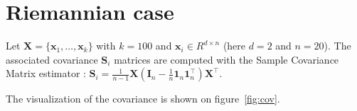 \section{Riemannian case}

Let $\boldsymbol{X} = \{\boldsymbol{x}_1, \ldots, \boldsymbol{x}_k\}$ with $k=100$ and $\boldsymbol{x}_i \in R^{d\times n}$ (here $d=2$ and $n=20$). The associated covariance $\boldsymbol{S}_i$ matrices are computed with the Sample Covariance Matrix estimator : $\boldsymbol{S}_i = \frac{1}{n-1} \boldsymbol{X}(\boldsymbol{I}_n - \frac{1}{n}\boldsymbol{1}_n\boldsymbol{1}_n^\intercal)\boldsymbol{X}^\intercal$.

The visualization of the covariance is shown on figure~\ref{fig:cov}.
